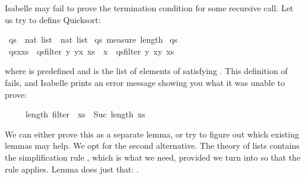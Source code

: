 \begin{isabellebody}
\begin{isamarkuptext}
Isabelle may fail to prove the termination condition for some
recursive call.  Let us try to define Quicksort:%
\end{isamarkuptext}%
\isamarkuptrue%
\isamarkupfalse%
\ qs\ {\isacharcolon}{\isacharcolon}\ {\isachardoublequoteopen}nat\ list\ {\isasymRightarrow}\ nat\ list{\isachardoublequoteclose}\isanewline
{}\isamarkupfalse%
\ qs\ {\isachardoublequoteopen}measure\ length{\isachardoublequoteclose}\isanewline
\ {\isachardoublequoteopen}qs\ {\isacharbrackleft}{\isacharbrackright}\ {\isacharequal}\ {\isacharbrackleft}{\isacharbrackright}{\isachardoublequoteclose}\isanewline
\ {\isachardoublequoteopen}qs{\isacharparenleft}x{\isacharhash}xs{\isacharparenright}\ {\isacharequal}\ qs{\isacharparenleft}filter\ {\isacharparenleft}{\isasymlambda}y{\isachardot}\ y{\isasymle}x{\isacharparenright}\ xs{\isacharparenright}\ {\isacharat}\ {\isacharbrackleft}x{\isacharbrackright}\ {\isacharat}\ qs{\isacharparenleft}filter\ {\isacharparenleft}{\isasymlambda}y{\isachardot}\ x{\isacharless}y{\isacharparenright}\ xs{\isacharparenright}{\isachardoublequoteclose}%
\begin{isamarkuptext}%
\noindent where  is predefined and 
is the list of elements of  satisfying .
This definition of  fails, and Isabelle prints an error message
showing you what it was unable to prove:
\begin{isabelle}%
\ \ \ \ \ length\ {\isacharparenleft}filter\ {\isachardot}{\isachardot}{\isachardot}\ xs{\isacharparenright}\ {\isacharless}\ Suc\ {\isacharparenleft}length\ xs{\isacharparenright}%
\end{isabelle}
We can either prove this as a separate lemma, or try to figure out which
existing lemmas may help. We opt for the second alternative. The theory of
lists contains the simplification rule ,
which is what we need, provided we turn \mbox{}
into
\isa{{\isasymle}} so that the rule applies. Lemma
 does just that: .


\end{isamarkuptext}
\end{isabellebody}
